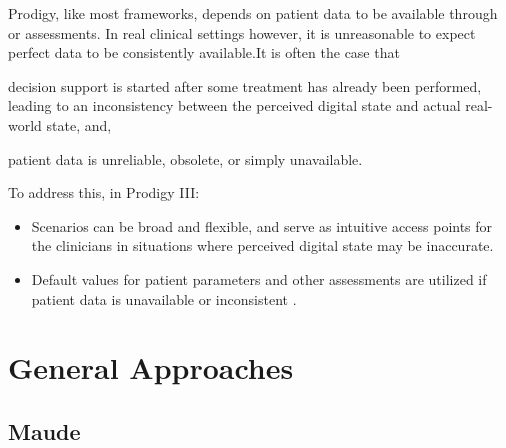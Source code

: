 Prodigy, like most \CDSSs{} frameworks, depends on patient data to
be available through \EHRs{} or \HCP{} assessments. In real clinical settings
however, it is unreasonable to expect perfect data to be consistently
available.It is often the case that
\begin{enumerate*}[label=(\alph*)]
  \item decision support is started after some treatment has already
    been performed, leading to an inconsistency between the perceived
    digital state and actual real-world state, and,
  \item patient data is unreliable, obsolete, or simply unavailable.
\end{enumerate*}
To address this, in Prodigy III:
\begin{itemize}
  \item Scenarios can be broad and flexible, and serve as intuitive access points for
    the clinicians in situations where perceived digital state may be
    inaccurate.
  \item Default values for patient parameters and other assessments are utilized
    if patient data is unavailable or inconsistent \cite{JohnsonAMIA00}.
\end{itemize}

\section{General Approaches}\label{sec:general-approaches}

\subsection{Maude}

